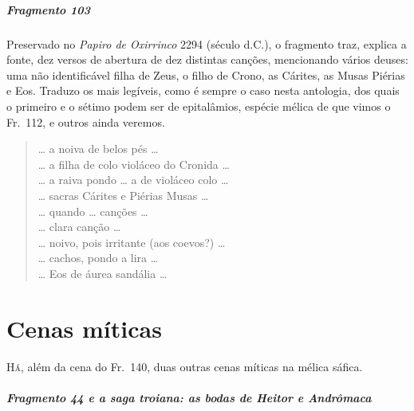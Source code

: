 \paragraph{Fragmento 103}

{\small Preservado  no \textit{Papiro de Oxirrinco} 2294 (século  d.C.), o fragmento traz, explica a fonte, dez versos de abertura de dez distintas canções, mencionando vários deuses: uma não identificável filha de Zeus, o filho de Crono, as Cárites, as Musas Piérias e Eos. Traduzo os mais legíveis, como é sempre o caso nesta antologia, dos quais o primeiro e o sétimo podem ser de epitalâmios, espécie mélica de que vimos o Fr.~112, e outros ainda veremos.}

\begin{verse}
\ldots{} a noiva de belos pés \ldots{}\\[8pt]
\ldots{} a filha de colo violáceo do Cronida \ldots{}\\[8pt]
\ldots{} a raiva pondo \ldots{} a de violáceo colo \ldots{}\\[8pt]
\ldots{} sacras Cárites e Piérias Musas \ldots{}\\[8pt]
\ldots{} quando \ldots{} canções \ldots{}\\[8pt]
\ldots{} clara canção \ldots{}\\[8pt]
\ldots{} noivo, pois irritante (aos coevos?) \ldots{}\\[8pt]
\ldots{} cachos, pondo a lira \ldots{}\\[8pt]
\ldots{} Eos de áurea sandália \ldots{}\\[8pt]
\end{verse}

\chapter{Cenas míticas}

\textsc{Há,} além da cena do Fr.~140, duas outras cenas míticas na mélica sáfica.

\paragraph{Fragmento 44 e a saga troiana: as bodas de Heitor e Andrômaca}

